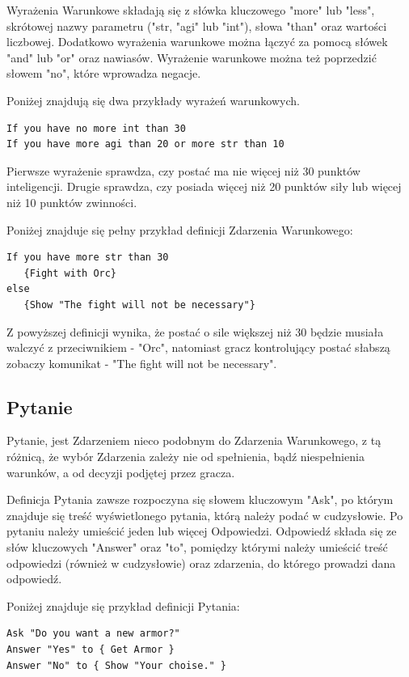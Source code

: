 \documentclass	{xmgr}
\begin{document}
Wyrażenia Warunkowe składają się z słówka kluczowego "more" lub "less", skrótowej nazwy parametru ("str, "agi" lub "int"), słowa "than" oraz wartości liczbowej. Dodatkowo wyrażenia warunkowe można łączyć za pomocą słówek "and" lub "or" oraz nawiasów. Wyrażenie warunkowe można też poprzedzić słowem "no", które wprowadza negacje.

Poniżej znajdują się dwa przykłady wyrażeń warunkowych.
\begin{lstlisting}
If you have no more int than 30
If you have more agi than 20 or more str than 10
\end{lstlisting}

Pierwsze wyrażenie sprawdza, czy postać ma nie więcej niż 30 punktów inteligencji. Drugie sprawdza, czy posiada więcej niż 20 punktów siły lub więcej niż 10 punktów zwinności.

Poniżej znajduje się pełny przykład definicji Zdarzenia Warunkowego: 
\begin{lstlisting}
If you have more str than 30 
   {Fight with Orc}
else 
   {Show "The fight will not be necessary"}
\end{lstlisting}

Z powyższej definicji wynika, że postać o sile większej niż 30 będzie musiała walczyć z przeciwnikiem - "Orc", natomiast gracz kontrolujący postać słabszą zobaczy komunikat - "The fight will not be necessary".

\subsection{Pytanie}
Pytanie, jest Zdarzeniem nieco podobnym do Zdarzenia Warunkowego, z tą różnicą, że wybór Zdarzenia zależy nie od spełnienia, bądź niespełnienia warunków, a od decyzji podjętej przez gracza.

Definicja Pytania zawsze rozpoczyna się słowem kluczowym "Ask", po którym znajduje się treść wyświetlonego pytania, którą należy podać w cudzysłowie. Po pytaniu należy umieścić jeden lub więcej Odpowiedzi. Odpowiedź składa się ze słów kluczowych "Answer" oraz "to", pomiędzy którymi należy umieścić treść odpowiedzi (również w cudzysłowie) oraz zdarzenia, do którego prowadzi dana odpowiedź. 

Poniżej znajduje się przykład definicji Pytania:
\begin{lstlisting}
Ask "Do you want a new armor?"
Answer "Yes" to { Get Armor }
Answer "No" to { Show "Your choise." }
\end{lstlisting}
\end{document}

